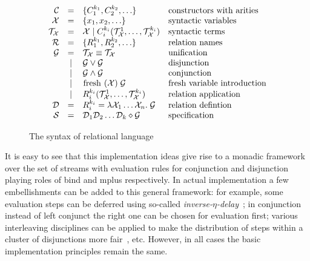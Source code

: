 \begin{figure}[t]
\[
  \begin{array}{rcll}
     \mathcal{C} & = & \{ C_1^{k_1}, C_2^{k_2}, \ldots \} 
     & \mbox{constructors with arities} 
     \\
     \mathcal{X} & = & \{x_1, x_2, \ldots \} 
     & \mbox{syntactic variables} 
     \\
     \mathcal{T}_\mathcal{X} & = & \mathcal{X} \mid C_i^{k_i}(\mathcal{T}_\mathcal{X}^1, \ldots, \mathcal{T}_\mathcal{X}^{k_i})
     & \mbox{syntactic terms} 
     \\
     \mathcal{R} & = & \{R_1^{k_1}, R_2^{k_2}, \ldots \} 
     & \mbox{relation names} 
     \\
     \mathcal{G} & =    & \mathcal{T}_\mathcal{X} \equiv \mathcal{T}_\mathcal{X} & \mbox{unification} \\
                 & \mid & \mathcal{G} \lor \mathcal{G} & \mbox{disjunction} \\
                 & \mid & \mathcal{G} \land \mathcal{G} & \mbox{conjunction} \\
                 & \mid & \mbox{\lstinline|fresh|} \; (\mathcal{X}) \; \mathcal{G} & \mbox{fresh variable introduction} \\
                 & \mid & R_i^{k_i}(\mathcal{T}_\mathcal{X}^1, \ldots, \mathcal{T}_\mathcal{X}^{k_i}) & \mbox{relation application} \\
    \mathcal{D} & = &R_i^{k_i} = \lambda \mathcal{X}_1 \ldots \mathcal{X}_n. \; \mathcal{G} & \mbox{relation defintion}\\
    \mathcal{S} & = &\mathcal{D}_1\mathcal{D}_2\dots\mathcal{D}_k \diamond \mathcal{G} & \mbox{specification}
  \end{array}
\]
    \caption{The syntax of relational language}
    \label{syntax}
\end{figure}


It is easy to see that this implementation ideas give rise to a monadic framework over the set of streams with evaluation rules for conjunction and disjunction playing roles of bind and
mplus respectively. In actual implementation a few embellishments can be added to this general framework: for example, some evaluation steps can be deferred using so-called
\emph{inverse-$\eta$-delay}~\cite{MicroKanren}; in conjunction instead of left conjunct the right one can be chosen for evaluation first; various interleaving disciplines can
be applied to make the distribution of steps within a cluster of disjunctions more fair~\cite{fair:towardsAM}, etc. However, in all cases the basic implementation principles remain
the same.

